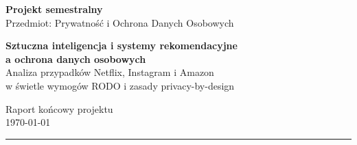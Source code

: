 \documentclass[12pt, a4paper]{article}
\begin{document}
\begin{titlepage}
  \centering
  \vspace*{1.5cm}

  {\large\bfseries Projekt semestralny}\\[0.4cm]
  {\small Przedmiot: Prywatność i Ochrona Danych Osobowych}\\[2cm]

  \begin{mdframed}[linewidth=1.5pt, linecolor=headerblue,
    topline=true, bottomline=true, leftline=true, rightline=true,
    innertopmargin=16pt, innerbottommargin=16pt,
    innerrightmargin=20pt, innerleftmargin=20pt]
    \centering
    {\LARGE\bfseries\color{headerblue}
    Sztuczna inteligencja i systemy rekomendacyjne\\[0.4cm]
    a ochrona danych osobowych\\[0.3cm]}
    {\large Analiza przypadków Netflix, Instagram i Amazon\\
    w świetle wymogów RODO i zasady privacy-by-design}
  \end{mdframed}

  \vspace{2cm}

  {\normalsize Raport końcowy projektu}\\[0.3cm]

  \vfill
  {\small \today}
\end{titlepage}

\tableofcontents
\newpage

\begin{abstract}
\noindent
Niniejszy raport stanowi końcowe podsumowanie projektu semestralnego poświęconego zagadnieniu sztucznej inteligencji i systemów rekomendacyjnych w kontekście ochrony danych osobowych. W pierwszej części omówiono kluczowe pojęcia teoretyczne: definicję i architekturę systemów rekomendacyjnych opartych na AI (AIRS), taksonomię zagrożeń prywatności oraz ramy prawne wynikające z RODO i zasady privacy-by-design. Następnie przeprowadzono szczegółową analizę trzech studiów przypadku: platformy streamingowej Netflix, platformy społecznościowej Instagram oraz platformy e-commerce Amazon. W kolejnej części dokonano komparatywnego zestawienia wszystkich trzech platform w zakresie minimalizacji danych, ograniczenia celu, przejrzystości, domyślnej ochrony prywatności i bezpieczeństwa technicznego. Raport kończy się wnioskami wskazującymi na systemowe napięcie między logiką maksymalizacji personalizacji a wymogami prawa ochrony danych.
\end{abstract}
\vspace{1em}
\hrule
\newpage
\end{document}
